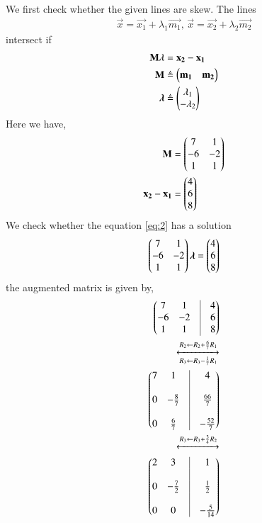 \documentclass[journal,12pt,twocolumn]{IEEEtran}
\begin{document}
We first check whether the given lines are skew. The lines 
\begin{align}
\vec{x} = \vec{x_1} + \lambda_1\vec{m_1},\, \vec{x} = \vec{x_2} + \lambda_2\vec{m_2} 
\label{eq:1}
\end{align}
intersect if
\begin{align}
\mathbf{M}{\lambda} &= \mathbf{x_2} - \mathbf{x_1}\\
\mathbf{M} &\triangleq \begin{pmatrix}\mathbf{m_1} & \mathbf{m_2}\end{pmatrix} \\
\bm{\lambda} &\triangleq \begin{pmatrix}\lambda_1\\-\lambda_2\end{pmatrix}\\
\end{align}
Here we have,
\begin{align}
\mathbf{M} &= \begin{pmatrix}7&1\\-6&-2\\1&1\end{pmatrix}\\
\mathbf{x_2} - \mathbf{x_1} &= \begin{pmatrix}4\\6\\8\end{pmatrix}
\end{align}
We check whether the equation \eqref{eq:2} has a solution
\begin{align}
\begin{pmatrix}7&1\\-6&-2\\1&1\end{pmatrix}\bm{\lambda} = \begin{pmatrix}4\\6\\8\end{pmatrix}
\label{eq:2}
\end{align}
the augmented matrix is given by,
\begin{align}
\myvec{7&1&\vrule&4\\-6&-2&\vrule&6\\1&1&\vrule&8}\\
\xleftrightarrow[R_3 \leftarrow R_3 - \frac{1}{7}R_1]{R_2 \leftarrow R_2 + \frac{6}{7}R_1}\\
\myvec{7&1&\vrule&4\\&&\vrule\\0&-\frac{8}{7}&\vrule&\frac{66}{7}\\&&\vrule\\0&\frac{6}{7}&\vrule&-\frac{52}{7}}\\
\xleftrightarrow{R_3 \leftarrow R_3 + \frac{3}{4}R_2}\\
\myvec{2&3&\vrule&1\\&&\vrule\\0&-\frac{7}{2}&\vrule&\frac{1}{2}\\&&\vrule\\0&0&\vrule&-\frac{5}{14}}
\end{align}
\end{document}
